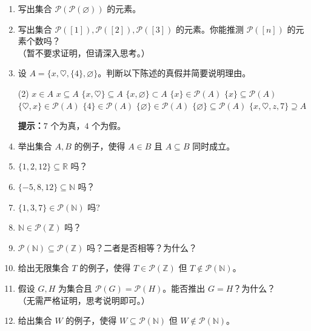 \begin{enumerate}[label=(\arabic*)]
    \item 写出集合 $\mathcal{P}(\mathcal{P}(\varnothing))$ 的元素。
    \item 写出集合 $\mathcal{P}([1]), \mathcal{P}([2]), \mathcal{P}([3])$ 的元素。你能推测 $\mathcal{P}([n])$ 的元素个数吗？\\（暂不要求证明，但请深入思考。）
    \item 设 $A = \big\{x, \heartsuit, \{4\} , \varnothing\big\}$。判断以下陈述的真假并简要说明理由。
        \begin{tasks}(2)
            \task $x \in A$
            \task $x \subseteq A$
            \task $\{x, \heartsuit\} \subseteq A$
            \task $\{x, \varnothing\} \subset A$
            \task $\{x\} \in \mathcal{P}(A)$
            \task $\{x\} \subseteq \mathcal{P}(A)$
            \task $\{\heartsuit, x\} \in \mathcal{P}(A)$
            \task $\{4\} \in \mathcal{P}(A)$
            \task $\{\varnothing\} \in \mathcal{P}(A)$
            \task $\{\varnothing\} \subseteq \mathcal{P}(A)$
            \task $\{x, \heartsuit, z, 7\} \supseteq A$
        \end{tasks}
        \textbf{提示：}$7$ 个为真，$4$ 个为假。
    \item 举出集合 $A, B$ 的例子，使得 $A \in B$ 且 $A \subseteq B$ 同时成立。
    \item $\{1, 2, 12\} \subseteq \mathbb{R}$ 吗？
    \item $\{-5, 8, 12\} \subseteq \mathbb{N}$ 吗？
    \item $\{1, 3, 7\} \in \mathcal{P}(\mathbb{N})$ 吗?
    \item $\mathbb{N} \in \mathcal{P}(\mathbb{Z})$ 吗？
    \item $\mathcal{P}(\mathbb{N}) \subseteq \mathcal{P}(\mathbb{Z})$ 吗？二者是否相等？为什么？
    \item 给出无限集合 $T$ 的例子，使得 $T \in \mathcal{P}(\mathbb{Z})$ 但 $T \notin \mathcal{P}(\mathbb{N})$。
    \item 假设 $G, H$ 为集合且 $\mathcal{P}(G) = \mathcal{P}(H)$。能否推出 $G = H$？为什么？\\（无需严格证明，思考说明即可。）
    \item 给出集合 $W$ 的例子，使得 $W \subseteq \mathcal{P}(\mathbb{N})$ 但 $W \notin \mathcal{P}(\mathbb{N})$。
\end{enumerate}
